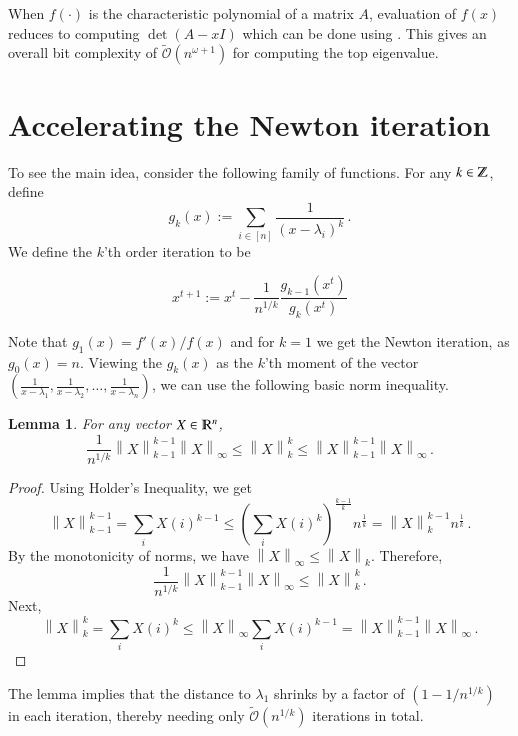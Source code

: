 \documentclass{article}[12pt]
\newtheorem{lemma}[theorem]{Lemma}
\theoremstyle{definition}
\renewcommand{\mathbb}{\varmathbb}
\renewcommand{\leq}{\leqslant}
\newenvironment{mybox}
{\center \noindent\begin{boxedminipage}{1.0\linewidth}}
{\end{boxedminipage}
\noindent
}
\newcommand{\mper}{\,.}
\newcommand{\paren}[1]{\left(#1 \right )}
\newcommand{\norm}[1]{\left\lVert#1\right\rVert}
\newcommand{\defeq}{\stackrel{\textup{def}}{=}}
\newcommand{\normi}[1]{\norm{#1}_{\scriptstyle \infty}}
\newcommand{\Z}{{\mathbb Z}}
\newcommand{\R}{\mathbb R}
\newcommand{\tbigO}{\tilde{\mathcal{O}}}
\newcommand{\tbigo}[1]{\tbigO\left(#1\right)}
\renewcommand{\defeq}{:=}
\newcommand{\charp}{f}
\newcommand{\mom}{g}
\begin{document}
When $\charp(\cdot)$ is the characteristic polynomial of a matrix $A$, 
evaluation of $\charp(x)$ reduces to computing $\det(A - xI)$ which can be done 
using . This gives an 
overall bit complexity of $\tbigo{n^{\omega+1}}$ for computing the top eigenvalue.


\section{Accelerating the Newton iteration}
\label{sec:algo}

To see the main idea, consider the following family of functions.
For any $k \in \Z$, define 
\[ \mom_k(x) \defeq \sum_{i \in [n]}  \frac{1}{ \paren{x - \lambda_i}^k  } \mper \]
We define the $k$'th order iteration to be 
\begin{mybox}
\begin{equation}
\label{eq:kth-order}
x^{t+1} \defeq x^t - \frac{1}{n^{1/k}}\frac{\mom_{k-1}(x^t)}{\mom_k(x^t)}
\end{equation}
\end{mybox}

Note that $\mom_1(x) = \charp'(x)/\charp(x)$ and for $k=1$ we get the Newton iteration, as $\mom_0(x) = n$.
Viewing the $\mom_k(x)$ as the $k$'th moment of the vector 
$\paren{\frac{1}{x-\lambda_1}, \frac{1}{x-\lambda_2}, \ldots, \frac{1}{x-\lambda_n}}$, we can use the following basic norm inequality.

\begin{lemma}
\label{lem:knorm}
For any vector $X \in \R^n$,
\[  \frac{1}{n^{1/k}} \norm{X}_{k-1}^{k-1} \normi{X}   \leq  \norm{X}_k^k \leq \norm{X}_{k-1}^{k-1} \normi{X}   \mper  \]
\end{lemma}
\begin{proof}
Using Holder's Inequality, we get 
\begin{equation}
\label{eq:helper1}
\norm{X}_{k-1}^{k-1}  = \sum_{i} X(i)^{k-1} \leq \paren{\sum_i X(i)^k}^{\frac{k-1}{k}} n^{  \frac{1}{k}} 
	= \norm{X}_k^{k-1} n^{\frac{1}{k} }
\mper 
\end{equation}
By the monotonicity of norms, we have
$\normi{X} \leq \norm{X}_k$. 
Therefore,
\[ \frac{1}{n^{1/k}} \norm{X}_{k-1}^{k-1} \normi{X}   \leq  \norm{X}_k^k \mper    \]
Next,
\[ \norm{X}_k^k = \sum_i X(i)^k \leq \normi{X} \sum_{i} X(i)^{k-1} =   \norm{X}_{k-1}^{k-1} \normi{X}   \mper \]
\end{proof}

The lemma implies that the distance to $\lambda_1$ shrinks by a factor of $(1-1/n^{1/k})$ in 
each iteration, thereby needing only $\tbigo{n^{1/k}}$ iterations in total. 
\end{document}
